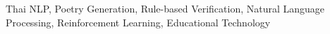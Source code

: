 \documentclass[conference]{IEEEtran}
\begin{document}
\maketitle

\begin{abstract}
\end{abstract}

\begin{IEEEkeywords}
Thai NLP, Poetry Generation, Rule-based Verification, Natural Language Processing, Reinforcement Learning, Educational Technology
\end{IEEEkeywords}
\end{document}
